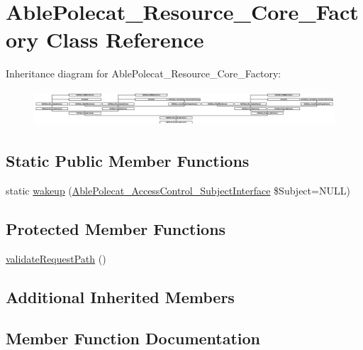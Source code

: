 \hypertarget{class_able_polecat___resource___core___factory}{}\section{Able\+Polecat\+\_\+\+Resource\+\_\+\+Core\+\_\+\+Factory Class Reference}
\label{class_able_polecat___resource___core___factory}
Inheritance diagram for Able\+Polecat\+\_\+\+Resource\+\_\+\+Core\+\_\+\+Factory\+:\begin{figure}[H]
\begin{center}
\leavevmode
\includegraphics[height=1.327913cm]{class_able_polecat___resource___core___factory}
\end{center}
\end{figure}
\subsection*{Static Public Member Functions}
\begin{DoxyCompactItemize}
\item 
static \hyperlink{class_able_polecat___resource___core___factory_a3f2135f6ad45f51d075657f6d20db2cd}{wakeup} (\hyperlink{interface_able_polecat___access_control___subject_interface}{Able\+Polecat\+\_\+\+Access\+Control\+\_\+\+Subject\+Interface} \$Subject=N\+U\+L\+L)
\end{DoxyCompactItemize}
\subsection*{Protected Member Functions}
\begin{DoxyCompactItemize}
\item 
\hyperlink{class_able_polecat___resource___core___factory_a285e624ef8874265991ea3478a7cd301}{validate\+Request\+Path} ()
\end{DoxyCompactItemize}
\subsection*{Additional Inherited Members}


\subsection{Member Function Documentation}
\hypertarget{class_able_polecat___resource___core___factory_a285e624ef8874265991ea3478a7cd301}{}
